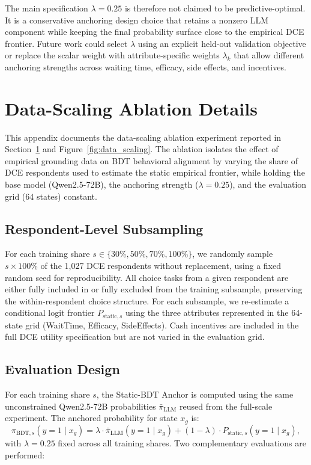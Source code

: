 \documentclass[11pt]{article}
\begin{document}
The main specification \(\lambda=0.25\) is therefore not claimed to be predictive-optimal. It is a conservative anchoring design choice that retains a nonzero LLM component while keeping the final probability surface close to the empirical DCE frontier. Future work could select \(\lambda\) using an explicit held-out validation objective or replace the scalar weight with attribute-specific weights \(\lambda_k\) that allow different anchoring strengths across waiting time, efficacy, side effects, and incentives.


\section{Data-Scaling Ablation Details}\label{sec:data_scaling}
\label{app:data_scaling}

This appendix documents the data-scaling ablation experiment reported in Section~\ref{sec:data_scaling} and Figure~\ref{fig:data_scaling}. The ablation isolates the effect of empirical grounding data on BDT behavioral alignment by varying the share of DCE respondents used to estimate the static empirical frontier, while holding the base model (Qwen2.5-72B), the anchoring strength ($\lambda = 0.25$), and the evaluation grid (64 states) constant.

\subsection{Respondent-Level Subsampling}
\label{app:subsampling}

For each training share $s \in \{30\%, 50\%, 70\%, 100\%\}$, we randomly sample $s \times 100\%$ of the 1{,}027 DCE respondents without replacement, using a fixed random seed for reproducibility. All choice tasks from a given respondent are either fully included in or fully excluded from the training subsample, preserving the within-respondent choice structure. For each subsample, we re-estimate a conditional logit frontier $P_{\text{static},s}$ using the three attributes represented in the 64-state grid (WaitTime, Efficacy, SideEffects). Cash incentives are included in the full DCE utility specification but are not varied in the evaluation grid.

\subsection{Evaluation Design}
\label{app:evaluation_design}

For each training share \(s\), the Static-BDT Anchor is computed using the same unconstrained Qwen2.5-72B probabilities \(\bar{\pi}_{\mathrm{LLM}}\) reused from the full-scale experiment. The anchored probability for state \(x_g\) is:
\[
\pi_{\mathrm{BDT},s}(y=1 \mid x_g)
=
\lambda \cdot \bar{\pi}_{\mathrm{LLM}}(y=1 \mid x_g)
+
(1-\lambda) \cdot P_{\mathrm{static},s}(y=1 \mid x_g),
\]
with \(\lambda = 0.25\) fixed across all training shares. Two complementary evaluations are performed:
\end{document}
